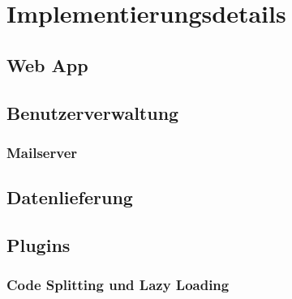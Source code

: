 \chapter{Implementierungsdetails}


\section{Web App}

\section{Benutzerverwaltung}
\subsection{Mailserver}

\section{Datenlieferung}

\section{Plugins}
\subsection{Code Splitting und Lazy Loading}
